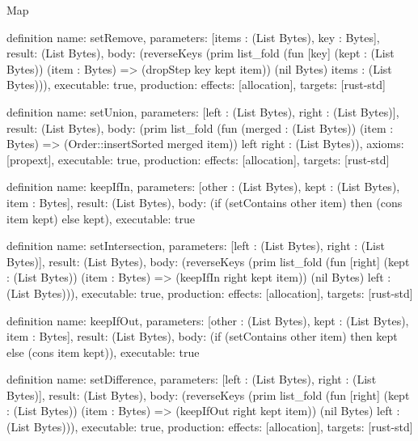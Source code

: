 \begin{lexlean}{Map}
\begin{semanticmodule}
definition{
  name: setRemove,
  parameters: [items : (List Bytes), key : Bytes],
  result: (List Bytes),
  body: (reverseKeys (prim list_fold (fun [key] (kept : (List Bytes)) (item : Bytes) => (dropStep key kept item)) (nil Bytes) items : (List Bytes))),
  executable: true,
  production: {effects: [allocation], targets: [rust-std]}
}

definition{
  name: setUnion,
  parameters: [left : (List Bytes), right : (List Bytes)],
  result: (List Bytes),
  body: (prim list_fold (fun (merged : (List Bytes)) (item : Bytes) => (Order::insertSorted merged item)) left right : (List Bytes)),
  axioms: [propext],
  executable: true,
  production: {effects: [allocation], targets: [rust-std]}
}

definition{
  name: keepIfIn,
  parameters: [other : (List Bytes), kept : (List Bytes), item : Bytes],
  result: (List Bytes),
  body: (if (setContains other item) then (cons item kept) else kept),
  executable: true
}

definition{
  name: setIntersection,
  parameters: [left : (List Bytes), right : (List Bytes)],
  result: (List Bytes),
  body: (reverseKeys (prim list_fold (fun [right] (kept : (List Bytes)) (item : Bytes) => (keepIfIn right kept item)) (nil Bytes) left : (List Bytes))),
  executable: true,
  production: {effects: [allocation], targets: [rust-std]}
}

definition{
  name: keepIfOut,
  parameters: [other : (List Bytes), kept : (List Bytes), item : Bytes],
  result: (List Bytes),
  body: (if (setContains other item) then kept else (cons item kept)),
  executable: true
}

definition{
  name: setDifference,
  parameters: [left : (List Bytes), right : (List Bytes)],
  result: (List Bytes),
  body: (reverseKeys (prim list_fold (fun [right] (kept : (List Bytes)) (item : Bytes) => (keepIfOut right kept item)) (nil Bytes) left : (List Bytes))),
  executable: true,
  production: {effects: [allocation], targets: [rust-std]}
}
\end{semanticmodule}
\end{lexlean}
